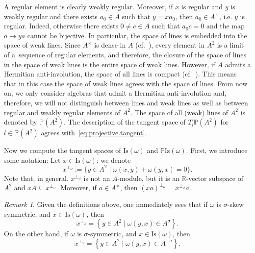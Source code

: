 \documentclass[oneside,11pt]{amsart}
\theoremstyle{definition}
\theoremstyle{remark}
\newtheorem{rem}[thm]{Remark}
\numberwithin{thm}{section}
\numberwithin{equation}{section}
\begin{document}
A regular element is clearly weakly regular. Moreover, if $x$ is regular and $y$ is weakly regular and there exists $a_0\in A$ such that $y=xa_0$, then $a_0\in A^\times$, i.e. $y$ is regular. Indeed, otherwise there exists $0 \neq c\in A$ such that $a_0c=0$ and the map $a\mapsto ya$ cannot be bijective. In particular, the space of lines is embedded into the space of weak lines. Since $A^\times$ is dense in $A$ (cf.~\cite[Proposition~2.30]{ABRRW}), every element in $A^2$ is a limit of a~sequence of regular elements, and therefore, the closure of the space of lines in the space of weak lines is the entire space of weak lines. However, if $A$ admits a Hermitian anti-involution, the space of all lines is compact (cf.~\cite[Corollary~4.2]{ABRRW}). This means that in this case the space of weak lines agrees with the space of lines. From now on, we only consider algebras that admit a Hermitian anti-involution and, therefore, we will not distinguish between lines and weak lines as well as between regular and weakly regular elements of $A^2$. The space of all (weak) lines of $A^2$ is denoted by $\mathbb P(A^2)$. The description of the tangent space of $T_l\mathbb P(A^2)$ for $l\in \mathbb P(A^2)$ agrees with~\eqref{eq:projective.tangent}.

Now we compute the tangent spaces of $\mathrm{Is}(\omega)$ and $\mathbb{P}\mathrm{Is}(\omega)$. First, we introduce some notation: Let $x\in \mathrm{Is}(\omega)$; we denote 
$$x^{\perp_{\omega}}:=\{y\in A^2\mid \omega(x,y)+\omega(y,x)=0\}.$$
Note that, in general, $x^{\perp_{\omega}}$ is not an $A$-module, but it is an $\mathbb R$-vector subspace of $A^2$ and $xA\subseteq x^{\perp_{\omega}}$. Moreover, if $a\in A^\times$, then $(xa)^{\perp_{\omega}}=x^{\perp_{\omega}}a$.

\begin{rem}\label{prop:tangent_skew}Given the definitions above, one immediately sees that 
if $\omega$ is $\sigma$-skew symmetric, and $x\in \mathrm{Is}(\omega)$, then 
$$
x^{\perp_{\omega}}=\left\{ y\in A^{2}\mid {{\omega }}(y,x)\in {A^{{\sigma}}}  \right\}.
$$ 
On the other hand, if $\omega$ is $\sigma$-symmetric, and $x\in \mathrm{Is}(\omega)$, then 
$$
x^{\perp_{\omega}}=\left\{ y\in A^{2}\mid {{\omega }}(y,x)\in {A^{{-\sigma}}}  \right\}.
$$   
\end{rem}
\end{document}
